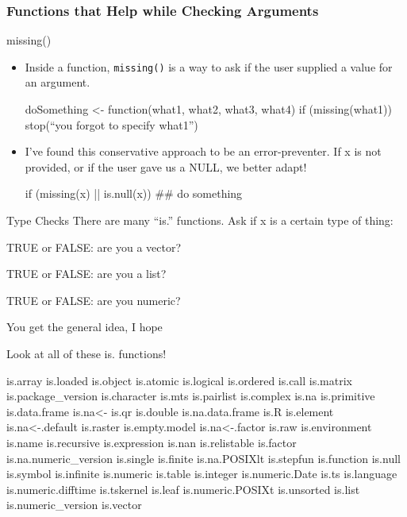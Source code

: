 \documentclass[11pt,english]{beamer}
\begin{document}
\begin{frame}
  \frametitle{Functions that Help while Checking  Arguments}

  \begin{exampleblock}{missing()}
    \begin{itemize}
    \item Inside a function, \texttt{missing()} is a way to
      ask if the user supplied a value for an argument.

\begin{Sinput}
doSomething <- function(what1, what2, what3, what4){
   if (missing(what1)) stop(``you forgot to specify what1'')
}
\end{Sinput}

   \item I've found this conservative approach to be an
     error-preventer. If x is not provided, or if the user gave us a
     NULL, we better adapt!
\begin{Sinput}
if (missing(x) || is.null(x)) ## do something
\end{Sinput}
\end{itemize}
\end{exampleblock}


\begin{exampleblock}{Type Checks}
     There are many ``is.'' functions. Ask if x is a
  certain type of thing:
  \begin{description}
  \item [is.vector()] TRUE or FALSE: are you a vector?
  \item [is.list()] TRUE or FALSE: are you a list?
  \item [is.numeric()] TRUE or FALSE: are you numeric?
  \item You get the general idea, I hope
  \end{description}
\end{exampleblock}


\begin{exampleblock}{Look at all of these is. functions!}
  \begin{Soutput}
is.array         is.loaded              is.object
is.atomic        is.logical             is.ordered
is.call          is.matrix              is.package_version
is.character     is.mts                 is.pairlist
is.complex       is.na                  is.primitive
is.data.frame    is.na<-                is.qr
is.double        is.na.data.frame       is.R
is.element       is.na<-.default        is.raster
is.empty.model   is.na<-.factor         is.raw
is.environment   is.name                is.recursive
is.expression    is.nan                 is.relistable
is.factor        is.na.numeric_version  is.single
is.finite        is.na.POSIXlt          is.stepfun
is.function      is.null                is.symbol
is.infinite      is.numeric             is.table
is.integer       is.numeric.Date        is.ts
is.language      is.numeric.difftime    is.tskernel
is.leaf          is.numeric.POSIXt      is.unsorted
is.list          is.numeric_version     is.vector
\end{Soutput}
\end{exampleblock}


\end{frame}
\end{document}
